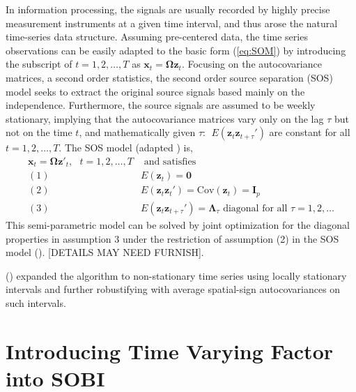 \documentclass[utf8,english]{gradu3}
\begin{document}
In information processing, the signals are usually recorded by highly precise measurement instruments at a given time interval, and thus arose the natural time-series data structure. Assuming pre-centered data, the time series observations can be easily adapted to the basic form (\ref{eq:SOM}) by introducing the subscript of $t=1,2,\dots, T$ as $\boldsymbol{x}_t = \boldsymbol{\Omega z}_t$. Focusing on the autocovariance matrices, a second order statistics, the second order source separation (SOS) model seeks to extract the original source signals based mainly on the independence. Furthermore, the source signals are assumed to be weekly stationary, implying that the autocovariance matrices vary only on the lag $\tau$ but not on the time $t$, and mathematically given $\tau:\ \ E(\boldsymbol z_t \boldsymbol z_{t+\tau}')$ are constant for all $t=1,2,\dots,T$. The SOS model (adapted \cite{miettinen2016separation}) is,
\begin{equation}
\label{eq: sos model}
\begin{aligned} 
    \boldsymbol x_t = \boldsymbol{\Omega}\boldsymbol z'_t,\ \ \ t=1,2,\dots,T &\text{ and satisfies} 
\\ (1)\ & E( \boldsymbol z_t) = \boldsymbol 0 
\\ (2)\ & E( \boldsymbol z_t \boldsymbol z_t') = \text{Cov}( \boldsymbol z_t) = \boldsymbol I_p
\\ (3)\ & E( \boldsymbol z_t \boldsymbol z_{t+\tau}') = \boldsymbol\Lambda_\tau \text{ diagonal for all } \tau = 1,2,\dots
\end{aligned}    
\end{equation}
This semi-parametric model can be solved by joint optimization for the diagonal properties in assumption 3 under the restriction of assumption (2) in the SOS model (\cite{miettinen2016separation}). [DETAILS MAY NEED FURNISH].

\citeauthor{nordhausen2014robustifying} (\citeyear{nordhausen2014robustifying}) expanded the algorithm to non-stationary time series using locally stationary intervals and further robustifying with average spatial-sign autocovariances on such intervals.

\section{Introducing Time Varying Factor into SOBI}
\end{document}
